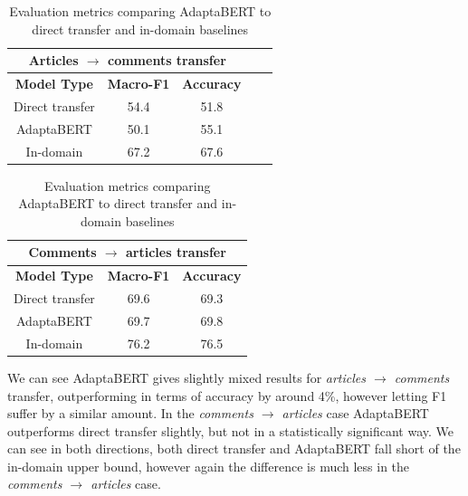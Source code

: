 \begin{table}[ht]
    \begin{center}
        \begin{tabular}{|c|c|c|c|c|}
            \hline
            \multicolumn{3}{|c|}{\textbf{Articles $ \rightarrow $ comments transfer}} \\
            \hline
            \textbf{Model Type} & \textbf{Macro-F1} & \textbf{Accuracy} \\
            \hline
            Direct transfer & 54.4 & 51.8  \\
            AdaptaBERT & 50.1 & 55.1 \\
            \hline
            In-domain & 67.2 & 67.6 \\
            \hline
        \end{tabular}
    \end{center} \vspace{10pt}
    \begin{center}
        \begin{tabular}{|c|c|c|}
            \hline
            \multicolumn{3}{|c|}{\textbf{Comments $ \rightarrow $ articles transfer}} \\
            \hline
            \textbf{Model Type} & \textbf{Macro-F1} & \textbf{Accuracy} \\
            \hline
            Direct transfer & 69.6 & 69.3  \\
            AdaptaBERT & 69.7 & 69.8 \\
            \hline
            In-domain & 76.2 & 76.5  \\
            \hline
        \end{tabular}
    \end{center}
    \caption{Evaluation metrics comparing AdaptaBERT to direct transfer and in-domain baselines}
    \label{tab:adaptabert-results}
\end{table}

We can see AdaptaBERT gives slightly mixed results for \textit{articles $ \rightarrow $ comments} transfer, outperforming in terms of accuracy by around 4\%, however letting F1 suffer by a similar amount. In the \textit{comments $ \rightarrow $ articles} case AdaptaBERT outperforms direct transfer slightly, but not in a statistically significant way. We can see in both directions, both direct transfer and AdaptaBERT fall short of the in-domain upper bound, however again the difference is much less in the \textit{comments $ \rightarrow $ articles} case.

